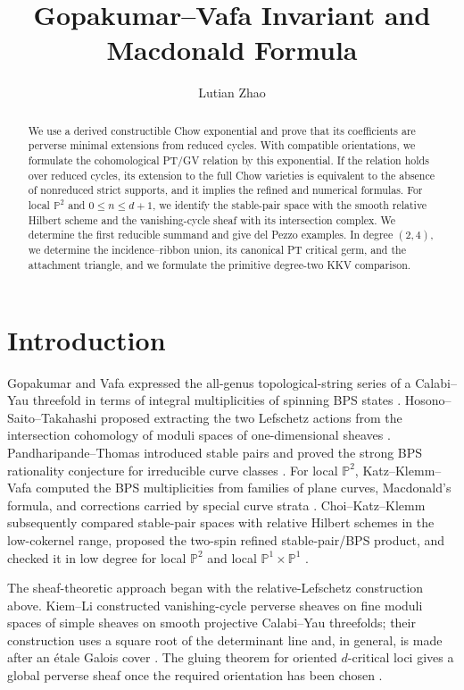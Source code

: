\documentclass[11pt,reqno]{amsart}
\title[Gopakumar--Vafa Invariant and Macdonald Formula]
{Gopakumar--Vafa Invariant and Macdonald Formula}
\author{Lutian Zhao}
\theoremstyle{definition}
\newcommand{\Pp}{\mathbb P}
\begin{document}
\begin{abstract}
We use a derived constructible Chow exponential and prove that its
coefficients are perverse minimal extensions from reduced cycles.  With
compatible orientations, we formulate the cohomological PT/GV relation by
this exponential.  If the relation holds over reduced cycles, its extension
to the full Chow varieties is equivalent to the absence of nonreduced strict
supports, and it implies the refined and numerical formulas.  For local
$\Pp^2$ and $0\le n\le d+1$, we identify the stable-pair space with the
smooth relative Hilbert scheme and the vanishing-cycle sheaf with its
intersection complex.  We determine the first reducible summand and give
del Pezzo examples.  In degree $(2,4)$, we determine the incidence--ribbon
union, its canonical PT critical germ, and the attachment triangle, and we
formulate the primitive degree-two KKV comparison.
\end{abstract}

\maketitle

\section{Introduction}
Gopakumar and Vafa expressed the all-genus topological-string series of a
Calabi--Yau threefold in terms of integral multiplicities of spinning BPS
states \cite{GopakumarVafaI,GopakumarVafaII}.  Hosono--Saito--Takahashi
proposed extracting the two Lefschetz actions from the intersection
cohomology of moduli spaces of one-dimensional sheaves
\cite{HosonoSaitoTakahashi}.  Pandharipande--Thomas introduced stable pairs
\cite{PT} and proved the strong BPS rationality conjecture for irreducible
curve classes \cite{PTBPS}.  For local $\Pp^2$, Katz--Klemm--Vafa computed
the BPS multiplicities from families of plane curves, Macdonald's formula,
and corrections carried by special curve strata \cite{KKV}.
Choi--Katz--Klemm subsequently compared stable-pair spaces with relative
Hilbert schemes in the low-cokernel range, proposed the two-spin refined
stable-pair/BPS product, and checked it in low degree for local $\Pp^2$ and
local $\Pp^1\times\Pp^1$ \cite{CKK}.

The sheaf-theoretic approach began with the relative-Lefschetz construction
above.  Kiem--Li constructed vanishing-cycle perverse sheaves on fine moduli
spaces of simple sheaves on smooth projective Calabi--Yau threefolds; their
construction uses a square root of the determinant line and, in general, is
made after an \'etale Galois cover \cite{KiemLi}.  The gluing theorem
for oriented $d$-critical loci gives a global perverse sheaf once the required
orientation has been chosen \cite{BBDJS}.
\end{document}
